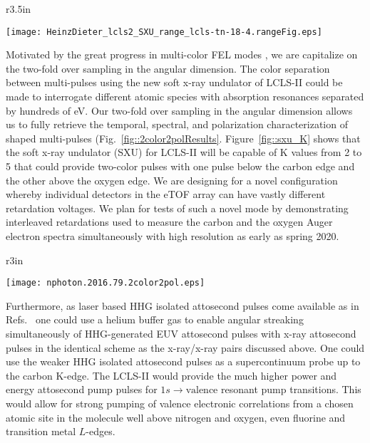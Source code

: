 \begin{wrapfigure}[16]{r}{3.5in}
\vspace{-1\baselineskip}
\centerline{
	\texttt{[image: HeinzDieter\_lcls2\_SXU\_range\_lcls-tn-18-4.rangeFig.eps]}
	}
\vspace{-1\baselineskip}
\caption{\label{fig::sxu_K} Soft x-ray undulator tuning range. \cite{HeinzDieter_SXU_twocolor}
	}
\end{wrapfigure}
Motivated by the great progress in multi-color FEL modes \cite{Lutman13_twocolor,Marinelli13_twocolor,Allaria2014,Marinelli2015,Prince2016,Lutman2016,Marinelli2016,Lutman2016FreshSlice}, we are capitalize on the two-fold over sampling in the angular dimension.
The color separation between multi-pulses using the new soft x-ray undulator of LCLS-II could be made to interrogate different atomic species with absorption resonances separated by hundreds of eV.
Our two-fold over sampling in the angular dimension allows us to fully retrieve the temporal, spectral, and polarization characterization of shaped multi-pulses (Fig.~\ref{fig::2color2polResults}\cite{Lutman2016,Lutman2016FreshSlice}.
Figure~\ref{fig::sxu_K} shows that the soft x-ray undulator (SXU) for LCLS-II will be capable of K values from 2 to 5 that could provide two-color pulses with one pulse below the carbon edge and the other above the oxygen edge.
We are designing for a novel configuration whereby individual detectors in the eTOF array can have vastly different retardation voltages.
We plan for tests of such a novel mode by demonstrating interleaved retardations used to measure the carbon and the oxygen Auger electron spectra simultaneously with high resolution as early as spring 2020.
\begin{wrapfigure}[20]{r}{3in}
\centerline{\texttt{[image: nphoton.2016.79.2color2pol.eps]}}
\caption{\label{fig::2color2polResults}Two-polarization, two color, pulse pair demonstration using the original CookieBox, reproduced from Ref.~\cite{Lutman2016}}
\end{wrapfigure}

Furthermore, as laser based HHG isolated attosecond pulses come available as in Refs.~\cite{Chen2014,Schmidt2016,Biegert2016,WornerSci2017} one could use a helium buffer gas to enable angular streaking simultaneously of HHG-generated EUV attosecond pulses with x-ray attosecond pulses in the identical scheme as the x-ray/x-ray pairs discussed above.
One could use the weaker HHG isolated attosecond pulses \cite{Biegert2016} as a supercontinuum probe up to the carbon K-edge.
The LCLS-II would provide the much higher power and energy attosecond pump pulses for $1s\rightarrow\mbox{valence}$ resonant pump transitions.
This would allow for strong pumping of valence electronic correlations from a chosen atomic site in the molecule well above nitrogen and oxygen, even fluorine and transition metal $L$-edges.

